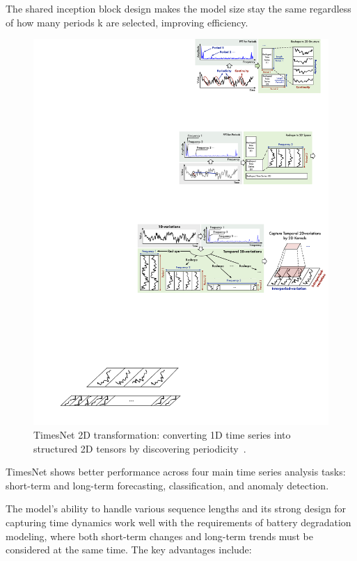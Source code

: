 The shared inception block design makes the model size stay the same regardless of how many periods k are selected, improving efficiency.

\begin{figure}[htbp]
    \centering
    \includegraphics[width=1.0\textwidth]{imgs/timesnet_2d_structure.pdf}
    \caption{TimesNet 2D transformation: converting 1D time series into structured 2D tensors by discovering periodicity~\cite{wu_timesnet_2023}.}
    \label{fig:timesnet_2d_transformation}
\end{figure}

TimesNet shows better performance across four main time series analysis tasks: short-term and long-term forecasting, classification, and anomaly detection.

The model's ability to handle various sequence lengths and its strong design for capturing time dynamics work well with the requirements of battery degradation modeling, where both short-term changes and long-term trends must be considered at the same time. The key advantages include:

